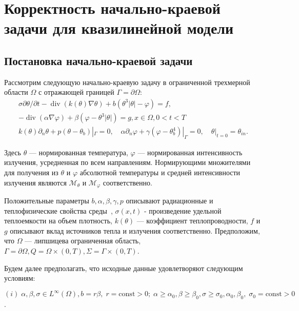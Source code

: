 \section{Корректность начально-краевой задачи для квазилинейной модели}
\label{sec:ch3:sec1}

\subsection{Постановка начально-краевой задачи}
\label{subsec:ch3/sec1/model}

Рассмотрим следующую начально-краевую задачу
в ограниченной трехмерной области $\Omega$ с
отражающей границей $\Gamma=\partial \Omega$:
\begin{gather}
    \sigma \partial \theta / \partial t
    -\operatorname{div}(k(\theta) \nabla \theta)
    +b\left(\theta^{3}|\theta|
    -\varphi\right)=f, \label{eq:3_1:1} \\
    -\operatorname{div}(\alpha \nabla \varphi)
    + \beta\left(\varphi-\theta^{3}|\theta|\right)=g,
    x \in \Omega, 0<t<T \label{eq:3_1:2}\\
    k(\theta) \partial_{n} \theta
    + p\left(\theta-\theta_{b}\right)|_{\Gamma}=0,
    \quad \alpha \partial_{n} \varphi
    + \gamma\left(\varphi-\theta_{b}^{4}\right)|_{\Gamma}=0,
    \quad \theta|_{t=0}=\theta_{i n}. \label{eq:3_1:3}
\end{gather}

Здесь $\theta$ — нормированная температура, $\varphi$ — нормированная интенсивность излучения,
усредненная по всем направлениям.
Нормирующими множителями для получения из
$\theta$ и $\varphi$ абсолютной температуры и средней интенсивности излучения
являются $\mathcal{M}_{\theta}$ и $\mathcal{M}_{\varphi}$ соответственно.


Положительные параметры $b, \alpha, \beta, \gamma, p$ описывают радиационные
и теплофизические свойства среды~\cite{Chebotarev2017}, $\sigma(x, t)$ - произведение
удельной теплоемкости на объем плотность, $k(\theta)$ — коэффициент теплопроводности,
$f$ и $g$ описывают вклад источников тепла и излучения соответственно.
Предположим, что $\Omega$ — липшицева ограниченная область,
$\Gamma=\partial \Omega, Q=\Omega \times(0, T), \Sigma=\Gamma \times(0, T)$.

Будем далее предполагать, что исходные данные удовлетворяют следующим условиям:

$(i)\;\alpha, \beta, \sigma \in L^{\infty}(\Omega), b=r \beta,\; r= \text{const} >0;\;
\alpha \geq \alpha_{0}, \beta \geq \beta_{0},
\sigma \geq \sigma_{0}, \alpha_{0}, \beta_{0},\; \sigma_{0}=\text{const}>0$.

